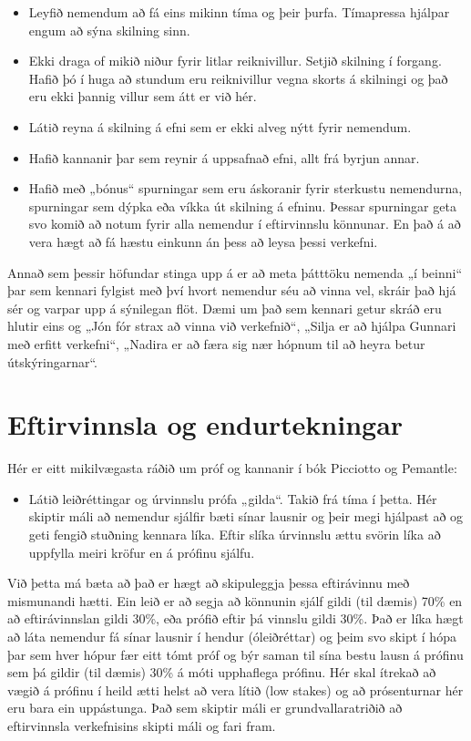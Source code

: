 \documentclass[
  icelandic,
]{book}
\providecommand{\tightlist}{%
  \setlength{\itemsep}{0pt}\setlength{\parskip}{0pt}}
\theoremstyle{definition}
\theoremstyle{definition}
\theoremstyle{definition}
\theoremstyle{definition}
\theoremstyle{remark}
\begin{document}
\begin{itemize}
\tightlist
\item
  Leyfið nemendum að fá eins mikinn tíma og þeir þurfa. Tímapressa hjálpar engum að sýna skilning sinn.
\item
  Ekki draga of mikið niður fyrir litlar reiknivillur. Setjið skilning í forgang. Hafið þó í huga að stundum eru reiknivillur vegna skorts á skilningi og það eru ekki þannig villur sem átt er við hér.
\item
  Látið reyna á skilning á efni sem er ekki alveg nýtt fyrir nemendum.
\item
  Hafið kannanir þar sem reynir á uppsafnað efni, allt frá byrjun annar.
\item
  Hafið með „bónus`` spurningar sem eru áskoranir fyrir sterkustu nemendurna, spurningar sem dýpka eða víkka út skilning á efninu. Þessar spurningar geta svo komið að notum fyrir alla nemendur í eftirvinnslu könnunar. En það á að vera hægt að fá hæstu einkunn án þess að leysa þessi verkefni.
\end{itemize}

Annað sem þessir höfundar stinga upp á er að meta þátttöku nemenda „í beinni`` þar sem kennari fylgist með því hvort nemendur séu að vinna vel, skráir það hjá sér og varpar upp á sýnilegan flöt. Dæmi um það sem kennari getur skráð eru hlutir eins og „Jón fór strax að vinna við verkefnið``, „Silja er að hjálpa Gunnari með erfitt verkefni``, „Nadira er að færa sig nær hópnum til að heyra betur útskýringarnar``.

\section{Eftirvinnsla og endurtekningar}\label{eftirvinnsla-og-endurtekningar}

Hér er eitt mikilvægasta ráðið um próf og kannanir í bók Picciotto og Pemantle:

\begin{itemize}
\tightlist
\item
  Látið leiðréttingar og úrvinnslu prófa „gilda``. Takið frá tíma í þetta. Hér skiptir máli að nemendur sjálfir bæti sínar lausnir og þeir megi hjálpast að og geti fengið stuðning kennara líka. Eftir slíka úrvinnslu ættu svörin líka að uppfylla meiri kröfur en á prófinu sjálfu.
\end{itemize}

Við þetta má bæta að það er hægt að skipuleggja þessa eftirávinnu með mismunandi hætti. Ein leið er að segja að könnunin sjálf gildi (til dæmis) 70\% en að eftirávinnslan gildi 30\%, eða prófið eftir þá vinnslu gildi 30\%. Það er líka hægt að láta nemendur fá sínar lausnir í hendur (óleiðréttar) og þeim svo skipt í hópa þar sem hver hópur fær eitt tómt próf og býr saman til sína bestu lausn á prófinu sem þá gildir (til dæmis) 30\% á móti upphaflega prófinu. Hér skal ítrekað að vægið á prófinu í heild ætti helst að vera lítið (low stakes) og að prósenturnar hér eru bara ein uppástunga. Það sem skiptir máli er grundvallaratriðið að eftirvinnsla verkefnisins skipti máli og fari fram.
\end{document}
